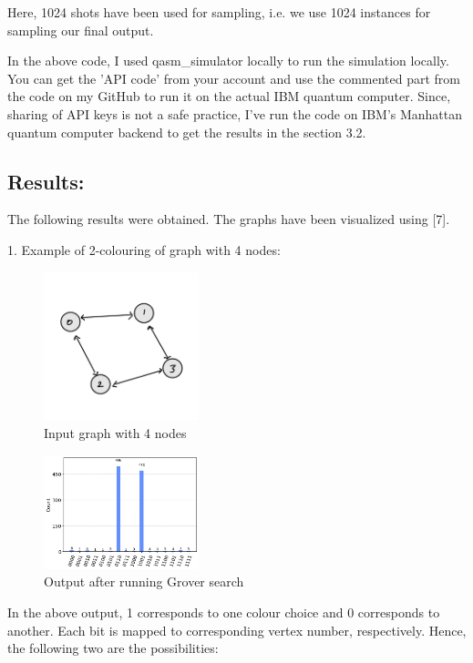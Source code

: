 \documentclass{article}
\begin{document}
Here, 1024 shots have been used for sampling, i.e. we use 1024 instances for sampling our final output.

In the above code, I used qasm\_simulator locally to run the simulation locally. You can get the 'API code' from your account and use the commented part from the code on my GitHub to run it on the actual IBM quantum computer. Since, sharing of API keys is not a safe practice, I've run the code on IBM's Manhattan quantum computer backend to get the results in the section 3.2.

\subsection{Results:}

The following results were obtained. The graphs have been visualized using [7].

1. Example of 2-colouring of graph with 4 nodes:

\begin{figure}[h]
  \centering
\includegraphics[width=0.4\textwidth]{Graph4.jpeg}
  \caption{Input graph with 4 nodes}
\end{figure}

\begin{figure}[h]
  \centering
\includegraphics[width=0.4\textwidth]{output.png}
  \caption{Output after running Grover search}
\end{figure}

In the above output, 1 corresponds to one colour choice and 0 corresponds to another. Each bit is mapped to corresponding vertex number, respectively. Hence, the following two are the possibilities:
\end{document}

